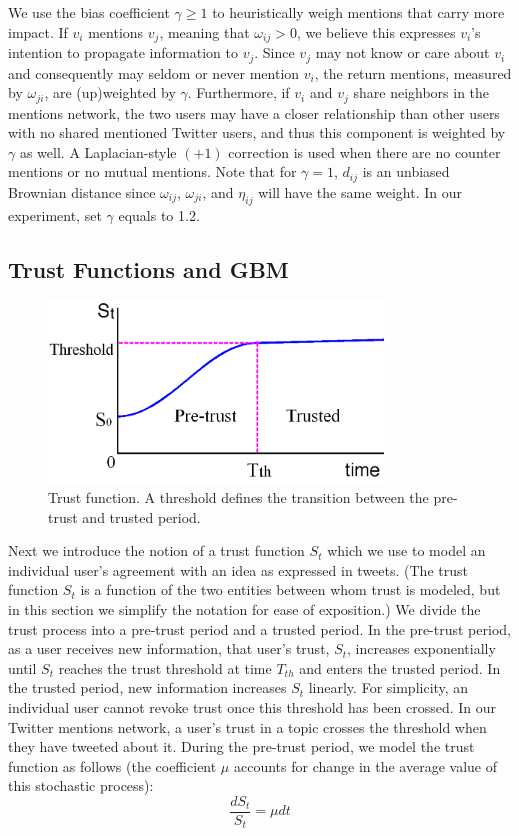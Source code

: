 We use the bias coefficient $\gamma \geq 1$ to heuristically
weigh mentions that carry more impact. If $v_i$ mentions $v_j$, meaning that $\omega_{ij} > 0$, we believe this expresses $v_i$'s intention to propagate information to $v_j$.
Since $v_j$ may not know or care about $v_i$ and consequently may seldom or never mention $v_i$, the return mentions, measured by $\omega_{ji}$, are (up)weighted by $\gamma$.
Furthermore, if $v_i$ and $v_j$ share neighbors in the mentions
network, the two users may have a closer relationship than other users
with no shared mentioned Twitter users, and thus this component
is weighted by $\gamma$ as well. 
A Laplacian-style $(+1)$ correction is used
when there are no counter mentions or no mutual mentions.
Note that for $\gamma = 1$, $d_{ij}$ is an unbiased Brownian distance since $\omega_{ij}$, $\omega_{ji}$, and $\eta_{ij}$ will have the same weight. In our experiment, set $\gamma$ equals to 1.2.

\subsection{Trust Functions and GBM}
\begin{figure}[ht]
\centering
\includegraphics[width=3.5in]{figures/trustFunction.png} %
\caption{Trust function. A threshold defines the transition between the
pre-trust and trusted period.}
\label{fig:subgraph}
\end{figure}

Next we introduce the notion of a
trust function $S_t$ which we use to model an individual user's agreement with an idea as expressed in tweets.
(The trust function $S_t$ is a function of the two entities between whom
trust is modeled, but in this section we simplify the notation for
ease of exposition.)
We divide the trust process into a pre-trust
period and a trusted period.
In the pre-trust period, as a user receives new information, that user's trust, $S_t$, increases exponentially until $S_t$ reaches the trust threshold at time $T_{th}$ and enters the trusted period.
In the trusted period, new information increases $S_t$ linearly. For simplicity, an individual user cannot revoke trust once this threshold has been crossed. In our Twitter mentions network, a user's trust in a topic crosses the threshold when they have tweeted about it. During the pre-trust period, we model the
trust function as follows (the coefficient $\mu$ accounts for change in the average value of this stochastic process):
\begin{equation}\frac{d S_t}{S_t} = \mu {dt}\end{equation}


